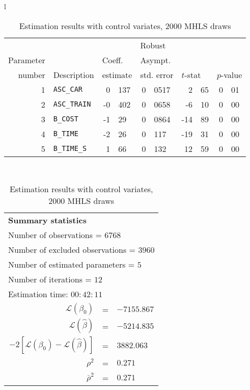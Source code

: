 \documentclass[12pt,a4paper]{article}
\begin{document}
\begin{table}[htb]
  \begin{tabular}{l}
\begin{tabular}{rlr@{.}lr@{.}lr@{.}lr@{.}l}
         &                       &   \multicolumn{2}{l}{}    & \multicolumn{2}{l}{Robust}  &     \multicolumn{4}{l}{}   \\
Parameter &                       &   \multicolumn{2}{l}{Coeff.}      & \multicolumn{2}{l}{Asympt.}  &     \multicolumn{4}{l}{}   \\
number &  Description                     &   \multicolumn{2}{l}{estimate}      & \multicolumn{2}{l}{std. error}  &   \multicolumn{2}{l}{$t$-stat}  &   \multicolumn{2}{l}{$p$-value}   \\

\hline

1 & \lstinline$ASC_CAR$ & 0&137 & 0&0517 & 2&65 & 0&01\\
2 & \lstinline$ASC_TRAIN$ & -0&402 & 0&0658 & -6&10 & 0&00\\
3 & \lstinline$B_COST$ & -1&29 & 0&0864 & -14&89 & 0&00\\
4 & \lstinline$B_TIME$ & -2&26 & 0&117 & -19&31 & 0&00\\
5 & \lstinline$B_TIME_S$ & 1&66 & 0&132 & 12&59 & 0&00\\
\hline
\end{tabular}
\\
\begin{tabular}{rcl}
\multicolumn{3}{l}{\bf Summary statistics}\\
\multicolumn{3}{l}{ Number of observations = $6768$} \\
\multicolumn{3}{l}{ Number of excluded observations = $3960$} \\
\multicolumn{3}{l}{ Number of estimated  parameters = $5$} \\
\multicolumn{3}{l}{ Number of iterations = $12$} \\
\multicolumn{3}{l}{ Estimation time: $00:42:11$} \\
 $\mathcal{L}(\beta_0)$ &=&  $-7155.867$ \\
 $\mathcal{L}(\hat{\beta})$ &=& $-5214.835 $  \\
 $-2[\mathcal{L}(\beta_0) -\mathcal{L}(\hat{\beta})]$ &=& $3882.063$ \\
    $\rho^2$ &=&   $0.271$ \\
    $\bar{\rho}^2$ &=&    $0.271$ \\
\end{tabular}
  \end{tabular}
\caption{\label{tab:estCV}Estimation results with control variates, 2000 MHLS draws}
\end{table}
\end{document}
